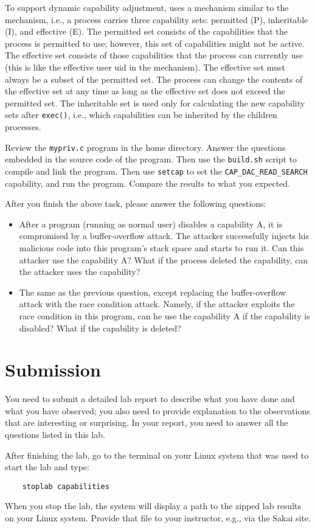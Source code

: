To support dynamic capability adjustment, \linux uses a mechanism similar
to the \setuid mechanism, i.e., a process carries three capability sets:
permitted (P), inheritable (I), and  effective (E).
The permitted set consists of the capabilities that the process is permitted
to use; however, this set of capabilities might not be active.
The effective set consists of those capabilities that the process can currently
use (this is like the effective user uid in the \setuid mechanism).
The effective set must always be a subset of the permitted set.
The process can change the contents of the effective set at any time as long as the
effective set does not exceed the permitted set. The inheritable set is used
only for calculating the new capability sets after {\tt exec()}, i.e.,
which capabilities can be inherited by the children processes.

Review the \texttt{mypriv.c} program in the home directory.  Answer the
questions embedded in the source code of the program.  Then use the
\texttt{build.sh} script to compile and link the program. Then use \texttt{setcap}
to set the \texttt{CAP\_DAC\_READ\_SEARCH} capability, and run the program.
Compare the results to what you expected.

After you finish the above task, please answer the following questions:
\begin{itemize}
\item \myquestion After a program (running as normal user)  disables a capability A,
it is compromised
by a buffer-overflow attack. The attacker successfully injects his malicious
code into this program's stack space and starts to run it. Can this attacker use
the capability A? What if the process deleted the capability, can the attacker
uses the capability?

\item \myquestion The same as the previous question, except replacing the
buffer-overflow attack with the race condition attack. Namely, if
the attacker exploits the race condition in this program, can he use the
capability A if the capability is disabled? What if the capability is
deleted?


\end{itemize}


\section{Submission}

You need to submit a detailed lab report to describe what you have
done and what you have observed; you also need to provide explanation
to the observations that are interesting or surprising. In your report,
you need to answer all the questions listed in this lab.

After finishing the lab, go to the terminal on your Linux system that was used to start the lab and type:
\begin{verbatim}
    stoplab capabilities
\end{verbatim}
When you stop the lab, the system will display a path to the zipped lab results on your Linux system.  Provide that file to
your instructor, e.g., via the Sakai site.




